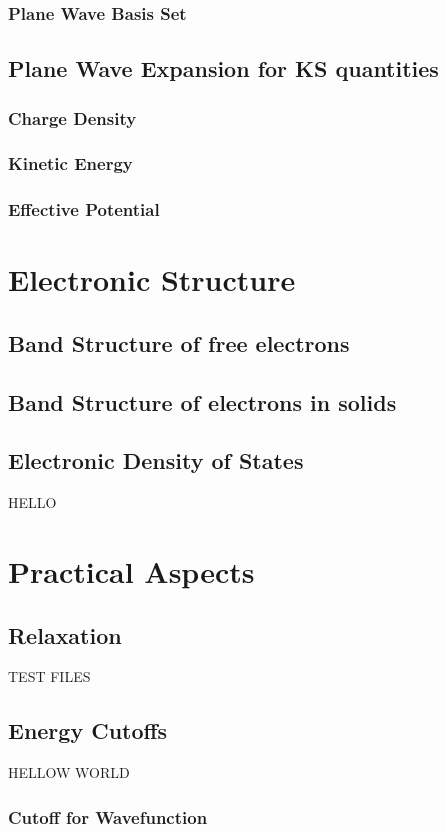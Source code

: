         \subsubsection{Plane Wave Basis Set}
    \subsection{Plane Wave Expansion for KS quantities}
        \subsubsection{Charge Density}
        \subsubsection{Kinetic Energy}
        \subsubsection{Effective Potential}
\section{Electronic Structure}
    \subsection{Band Structure of free electrons}
    \subsection{Band Structure of electrons in solids}
    \subsection{Electronic Density of States}

    HELLO
\section{Practical Aspects}
    \subsection{Relaxation}
    TEST FILES
    \subsection{Energy Cutoffs}
    HELLOW WORLD
        \subsubsection{Cutoff for Wavefunction}
